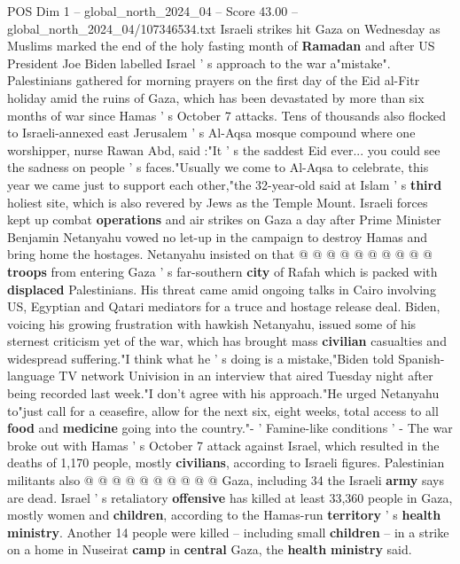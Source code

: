 \begin{textsample}{POS Dim 1 – global\_north\_2024\_04 – Score 43.00 – global\_north\_2024\_04/107346534.txt}  \label{ex:f1_pos_193}
Israeli strikes hit Gaza on Wednesday as Muslims marked the end of the holy fasting month of \textbf{Ramadan} and after US President Joe Biden labelled Israel ' s approach to the war a"mistake".
Palestinians gathered for morning prayers on the first day of the Eid al-Fitr holiday amid the ruins of Gaza, which has been devastated by more than six months of war since Hamas ' s October 7 attacks.
Tens of thousands also flocked to Israeli-annexed east Jerusalem ' s Al-Aqsa mosque compound where one worshipper, nurse Rawan Abd, said :"It ' s the saddest Eid ever... you could see the sadness on people ' s faces."Usually we come to Al-Aqsa to celebrate, this year we came just to support each other,"the 32-year-old said at Islam ' s \textbf{third} holiest site, which is also revered by Jews as the Temple Mount.
Israeli forces kept up combat \textbf{operations} and air strikes on Gaza a day after Prime Minister Benjamin Netanyahu vowed no let-up in the campaign to destroy Hamas and bring home the hostages.
Netanyahu insisted on that @ @ @ @ @ @ @ @ @ @ \textbf{troops} from entering Gaza ' s far-southern \textbf{city} of Rafah which is packed with \textbf{displaced} Palestinians.
His threat came amid ongoing talks in Cairo involving US, Egyptian and Qatari mediators for a truce and hostage release deal.
Biden, voicing his growing frustration with hawkish Netanyahu, issued some of his sternest criticism yet of the war, which has brought mass \textbf{civilian} casualties and widespread suffering."I think what he ' s doing is a mistake,"Biden told Spanish-language TV network Univision in an interview that aired Tuesday night after being recorded last week."I don't agree with his approach."He urged Netanyahu to"just call for a ceasefire, allow for the next six, eight weeks, total access to all \textbf{food} and \textbf{medicine} going into the country."- ' Famine-like conditions ' - The war broke out with Hamas ' s October 7 attack against Israel, which resulted in the deaths of 1,170 people, mostly \textbf{civilians}, according to Israeli figures.
Palestinian militants also @ @ @ @ @ @ @ @ @ @ Gaza, including 34 the Israeli \textbf{army} says are dead.
Israel ' s retaliatory \textbf{offensive} has killed at least 33,360 people in Gaza, mostly women and \textbf{children}, according to the Hamas-run \textbf{territory} ' s \textbf{health} \textbf{ministry}.
Another 14 people were killed -- including small \textbf{children} -- in a strike on a home in Nuseirat \textbf{camp} in \textbf{central} Gaza, the \textbf{health} \textbf{ministry} said.

\end{textsample}
